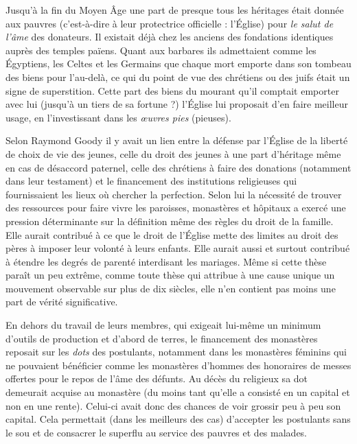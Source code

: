  Jusqu'à la fin du Moyen Âge une part de presque tous les héritages était donnée aux pauvres (c'est-à-dire à leur protectrice officielle : l'Église) pour \emph{le salut de l'âme} des donateurs. Il existait déjà chez les anciens des fondations identiques auprès des temples païens. Quant aux barbares ils admettaient comme les Égyptiens, les Celtes et les Germains que chaque mort emporte dans son tombeau des biens pour l'au-delà, ce qui du point de vue des chrétiens ou des juifs était un signe de superstition. Cette part des biens du mourant qu'il comptait emporter avec lui (jusqu'à un tiers de sa fortune ?) l'Église lui proposait d'en faire meilleur usage, en l'investissant dans les \emph{œuvres pies} (pieuses). 

 Selon Raymond Goody il y avait un lien entre la défense par l'Église de la liberté de choix de vie des jeunes, celle du droit des jeunes à une part d'héritage même en cas de désaccord paternel, celle des chrétiens à faire des donations (notamment dans leur testament) et le financement des institutions religieuses qui fournissaient les lieux où chercher la perfection. Selon lui la nécessité de trouver des ressources pour faire vivre les paroisses, monastères et hôpitaux a exercé une pression déterminante sur la définition même des règles du droit de la famille. Elle aurait contribué à ce que le droit de l'Église mette des limites au droit des pères à imposer leur volonté à leurs enfants. Elle aurait aussi et surtout contribué à étendre les degrés de parenté interdisant les mariages. Même si cette thèse paraît un peu extrême, comme toute thèse qui attribue à une cause unique un mouvement observable sur plus de dix siècles, elle n'en contient pas moins une part de vérité significative. 

 En dehors du travail de leurs membres, qui exigeait lui-même un minimum d'outils de production et d'abord de terres, le financement des monastères reposait sur les \emph{dots} des postulants, notamment dans les monastères féminins qui ne pouvaient bénéficier comme les monastères d'hommes des honoraires de messes offertes pour le repos de l'âme des défunts. Au décès du religieux sa dot demeurait acquise au monastère (du moins tant qu'elle a consisté en un capital et non en une rente). Celui-ci avait donc des chances de voir grossir peu à peu son capital. Cela permettait (dans les meilleurs des cas) d'accepter les postulants sans le sou et de consacrer le superflu au service des pauvres et des malades.
 